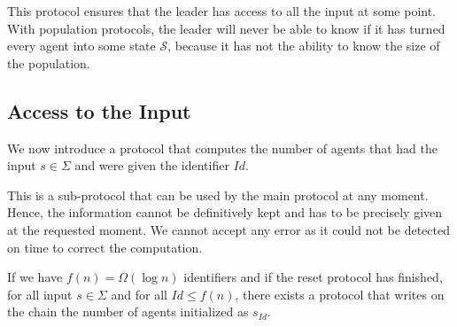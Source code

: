 \documentclass[UKenglish]{llncs}
\newcommand\SSS{\mathcal{S}}
\begin{document}
This protocol ensures that the leader has access to all the input
at some point. With population protocols, the leader will never be able to know
if it has turned every agent into some state $\SSS$, because it has not the
ability to know the size of the population.



\subsection{Access to the Input} 

We now
introduce a protocol that computes the number of agents
that had the input $s\in\Sigma$ and were given the identifier $Id$.

This is a sub-protocol that can be used by the
main protocol at any moment. Hence, the information cannot be definitively kept 
and has to be precisely given  at the requested moment.
We cannot accept any error as it could not be detected on time to correct the computation.



\begin{proposition}\label{prop:sid}
If we have $f(n)=\Omega(\log n)$ identifiers and 
if the reset protocol has finished,
for all input $s\in \Sigma$ and for all $Id\le f(n)$,
there exists a protocol that writes on the chain the number of agents initialized
as $s_{Id}$.  
\end{proposition}
\end{document}

